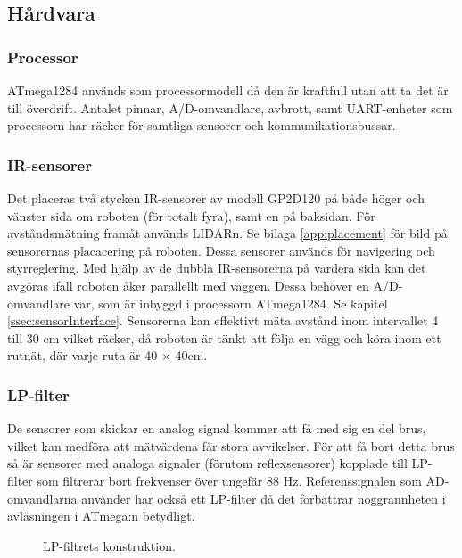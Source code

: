 \documentclass[a4paper,11pt]{article}
\begin{document}
\clearpage

\subsection{Hårdvara}

\subsubsection{Processor}
ATmega1284 används som processormodell då den är kraftfull utan att ta det är till överdrift. Antalet pinnar, A/D-omvandlare, avbrott, samt UART-enheter som processorn har räcker för samtliga sensorer och kommunikationsbussar.

\subsubsection{IR-sensorer} \label{sssec:sonicsensors}
Det placeras två stycken IR-sensorer av modell GP2D120 på både höger och vänster sida om roboten (för totalt fyra), samt en på baksidan. För avståndsmätning framåt används LIDARn. Se bilaga \ref{app:placement} för bild på sensorernas placacering på roboten. Dessa sensorer används för navigering och styrreglering. Med hjälp av de dubbla IR-sensorerna på vardera sida kan det avgöras ifall roboten åker parallellt med väggen. Dessa behöver en A/D-omvandlare var, som är inbyggd i processorn ATmega1284. Se kapitel \ref{ssec:sensorInterface}. Sensorerna kan effektivt mäta avstånd inom intervallet 4 till 30 cm vilket räcker, då roboten är tänkt att följa en vägg och köra inom ett rutnät, där varje ruta är 40 $\times$ 40cm.

\subsubsection{LP-filter}
De sensorer som skickar en analog signal kommer att få med sig en del brus, vilket kan medföra att mätvärdena får stora avvikelser. För att få bort detta brus så är sensorer med analoga signaler (förutom reflexsensorer) kopplade till LP-filter som filtrerar bort frekvenser över ungefär 88 \si{\hertz}. Referenssignalen som AD-omvandlarna använder har också ett LP-filter då det förbättrar noggrannheten i avläsningen i ATmega:n betydligt.

\begin{figure}[h!]
	\caption{LP-filtrets konstruktion.}
	\label{fig:lpFilter}
\end{figure}
\end{document}
